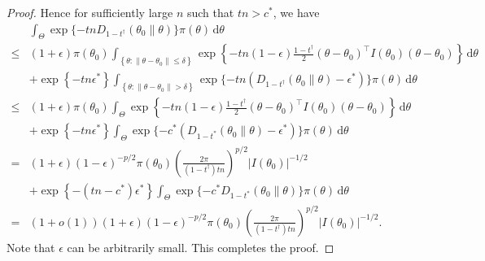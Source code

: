 \documentclass[11pt]{article}
\theoremstyle{plain}
\theoremstyle{definition}
\theoremstyle{remark}
\begin{document}
\begin{appendices}
\begin{proof}
Hence for sufficiently large $n$ such that $tn > c^*$, we have
\begin{align*}
        &\int_{ \Theta } \exp\{-tn D_{1-t^\dagger}(\theta_0 \| \theta)\} \pi (\theta) \, \mathrm d \theta
        \\
        \leq &
        (1+\epsilon) \pi(\theta_0)
        \int_{ \left\{ \theta: \|\theta - \theta_0\| \leq \delta \right\}}
        \exp\left\{ 
            -tn
        (1-\epsilon) \frac{1-t^\dagger}{2} (\theta -\theta_0)^\top I(\theta_0) (\theta - \theta_0)
        \right\}
        \, \mathrm d \theta
        \\
        &+
        \exp\left\{ -tn \epsilon^* \right\}
        \int_{\left\{ \theta: \|\theta - \theta_0\| > \delta \right\}} \exp\{-tn \left(D_{1-t^\dagger}(\theta_0 \| \theta) -\epsilon^*\right)\} \pi (\theta) \, \mathrm d \theta
        \\
        \leq &
        (1+\epsilon) \pi(\theta_0)
        \int_{\Theta}
        \exp\left\{ 
            -tn
        (1-\epsilon) \frac{1-t^\dagger}{2} (\theta -\theta_0)^\top I(\theta_0) (\theta - \theta_0)
        \right\}
        \, \mathrm d \theta
        \\
        &+
        \exp\left\{ -tn \epsilon^* \right\}
        \int_{\Theta} \exp\{-c^* \left(D_{1-t^*}(\theta_0 \| \theta) -\epsilon^*\right)\} \pi (\theta) \, \mathrm d \theta
        \\
        = &
        (1+\epsilon) (1-\epsilon)^{-p/2}  \pi(\theta_0) \left( \frac{2\pi}{(1-t^\dagger) tn } \right)^{p/2} |I(\theta_0)|^{-1/2}
        \\
        &+
        \exp\left\{ -(tn- c^*) \epsilon^* \right\}
        \int_{\Theta} \exp\{-c^* D_{1-t^*}(\theta_0 \| \theta) \} \pi (\theta) \, \mathrm d \theta
        \\
        = &
        (1+o(1))
        (1+\epsilon) (1-\epsilon)^{-p/2}  \pi(\theta_0) \left( \frac{2\pi}{(1-t^\dagger) tn } \right)^{p/2} |I(\theta_0)|^{-1/2}
        .
\end{align*}
Note that $\epsilon$ can be arbitrarily small. 
This completes the proof.
    
\end{proof}




\end{appendices}
\end{document}
